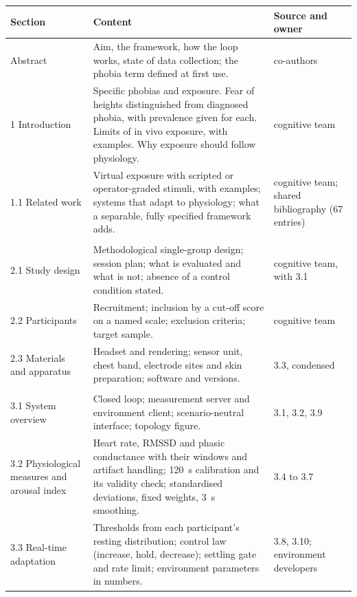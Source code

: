 \documentclass[11pt,a4paper]{article}
\begin{document}
\begin{longtable}{@{}L{3.4cm}L{8.6cm}L{3.6cm}@{}}
\toprule
\textbf{Section} & \textbf{Content} & \textbf{Source and owner} \\
\midrule
\endhead
\bottomrule
\endfoot
Abstract &
    Aim, the framework, how the loop works, state of data collection;
    the phobia term defined at first use. &
    co-authors \\
1 Introduction &
    Specific phobias and exposure. Fear of heights distinguished from
    diagnosed phobia, with prevalence given for each. Limits of in vivo
    exposure, with examples. Why exposure should follow physiology. &
    cognitive team \\
1.1 Related work &
    Virtual exposure with scripted or operator-graded stimuli, with
    examples; systems that adapt to physiology; what a separable, fully
    specified framework adds. &
    cognitive team; shared bibliography (67 entries) \\
\addlinespace[3pt]
 \\
2.1 Study design &
    Methodological single-group design; session plan; what is evaluated
    and what is not; absence of a control condition stated. &
    cognitive team, with 3.1 \\
2.2 Participants &
    Recruitment; inclusion by a cut-off score on a named scale;
    exclusion criteria; target sample. &
    cognitive team \\
2.3 Materials and apparatus &
    Headset and rendering; sensor unit, chest band, electrode sites and
    skin preparation; software and versions. &
    3.3, condensed \\
\addlinespace[3pt]
 \\
3.1 System overview &
    Closed loop; measurement server and environment client;
    scenario-neutral interface; topology figure. &
    3.1, 3.2, 3.9 \\
3.2 Physiological measures and arousal index &
    Heart rate, RMSSD and phasic conductance with their windows and
    artifact handling; 120~s calibration and its validity check;
    standardised deviations, fixed weights, 3~s smoothing. &
    3.4 to 3.7 \\
3.3 Real-time adaptation &
    Thresholds from each participant's resting distribution; control
    law (increase, hold, decrease); settling gate and rate limit;
    environment parameters in numbers. &
    3.8, 3.10; environment developers \\

\end{longtable}
\end{document}

